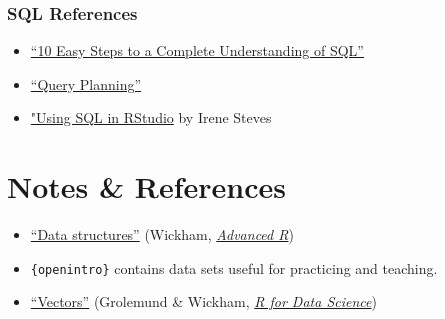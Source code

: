 \documentclass[
]{book}
\newenvironment{Shaded}{\begin{snugshade}}{\end{snugshade}}
\newcommand{\CommentTok}[1]{\textcolor[rgb]{0.56,0.35,0.01}{\textit{#1}}}
\newcommand{\ControlFlowTok}[1]{\textcolor[rgb]{0.13,0.29,0.53}{\textbf{#1}}}
\newcommand{\KeywordTok}[1]{\textcolor[rgb]{0.13,0.29,0.53}{\textbf{#1}}}
\newcommand{\NormalTok}[1]{#1}
\newcommand{\OperatorTok}[1]{\textcolor[rgb]{0.81,0.36,0.00}{\textbf{#1}}}
\newcommand{\StringTok}[1]{\textcolor[rgb]{0.31,0.60,0.02}{#1}}
\providecommand{\tightlist}{%
  \setlength{\itemsep}{0pt}\setlength{\parskip}{0pt}}
\begin{document}
\begin{Shaded}
\end{Shaded}

\hypertarget{sql-references}{%
\subsubsection{SQL References}\label{sql-references}}

\begin{itemize}
\tightlist
\item
  \href{https://blog.jooq.org/2016/03/17/10-easy-steps-to-a-complete-understanding-of-sql/}{``10 Easy Steps to a Complete Understanding of SQL''}
\item
  \href{https://www.sqlite.org/queryplanner.html}{``Query Planning''}
\item
  \href{https://irene.rbind.io/post/using-sql-in-rstudio/}{"Using SQL in RStudio} by Irene Steves
\end{itemize}

\hypertarget{notes-references}{%
\section{Notes \& References}\label{notes-references}}

\begin{itemize}
\tightlist
\item
  \href{http://adv-r.had.co.nz/Data-structures.html}{``Data structures''} (Wickham, \href{http://adv-r.had.co.nz/}{\emph{Advanced R}})
\item
  \texttt{\{openintro\}} contains data sets useful for practicing and teaching.
\item
  \href{https://r4ds.had.co.nz/vectors.html}{``Vectors''} (Grolemund \& Wickham, \href{https://r4ds.had.co.nz/}{\emph{R for Data Science}})
\end{itemize}
\end{document}
